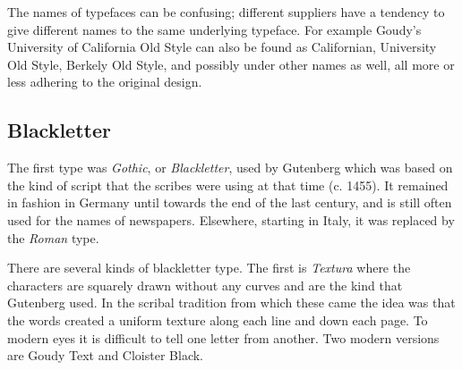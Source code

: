 \documentclass[10pt,letterpaper,extrafontsizes]{memoir}
\begin{document}
    The names of typefaces can be confusing; different suppliers have a
tendency to give different names to the same underlying typeface. For
example Goudy's University of California Old 
Style can also be found
as Californian, 
University Old Style, 
Berkely Old Style, 
and possibly under other names as well, all more or less adhering to the 
original design.


\subsection{Blackletter}

    The first type was \emph{Gothic}, or 
\emph{Blackletter}, used by 
Gutenberg which was based on
the kind of script that the scribes were using at that time (c. 1455). 
It remained in
fashion in Germany until towards the end of the last century, and is still
often used for the names of newspapers. Elsewhere, starting in Italy, 
it was replaced by the \emph{Roman} type. 

    There are several kinds of blackletter type. The first is 
\emph{Textura} where the characters are squarely 
drawn without any curves
and are the kind that Gutenberg used. 
In the scribal tradition from which these came the idea was that the words
created a uniform texture along each line and down each page. To modern eyes it
is difficult to tell one letter from another. Two modern versions are
Goudy Text and 
Cloister Black.
\end{document}
